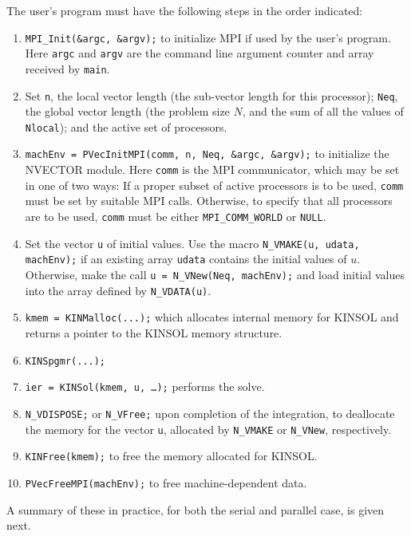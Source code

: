 \documentclass[11pt]{article}
\begin{document}
The user's program must have the following steps in the order indicated:
\vspace{.2 in}
\begin{enumerate}

\item {\tt MPI\_Init(\&argc, \&argv);} to initialize MPI if used by
the user's program.  Here {\tt argc} and {\tt argv} are the command
line argument counter and array received by {\tt main}.

\item Set {\tt n}, the local vector length (the sub-vector
length for this processor); {\tt Neq}, the global vector length (the
problem size $N$, and the sum of all the values of {\tt Nlocal});
and the active set of processors.

\item {\tt machEnv = PVecInitMPI(comm, n, Neq, \&argc, \&argv);} to
initialize the NVECTOR module.  Here {\tt comm} is the MPI
communicator, which may be set in one of two ways: If a proper subset of active
processors is to be used, {\tt comm} must be set by suitable MPI
calls.  Otherwise, to specify that all processors are to be used, 
{\tt comm} must be either {\tt MPI\_COMM\_WORLD} or {\tt NULL}.

\item Set the vector {\tt u} of initial values.  Use the macro
{\tt N\_VMAKE(u, udata, machEnv);} if an existing array {\tt udata} 
contains the initial values of $u$.  Otherwise, make the call
{\tt u = N\_VNew(Neq, machEnv);} and load initial values into
the array defined by {\tt N\_VDATA(u)}.

\item {\tt kmem = KINMalloc(...);} which allocates internal
memory for KINSOL and returns a pointer to the KINSOL memory structure. 

\item {\tt KINSpgmr(...);}

\item {\tt ier = KINSol(kmem,  u, \ldots );} performs the solve.

\item {\tt N\_VDISPOSE;} or {\tt N\_VFree;} upon completion of the
integration, to deallocate the memory for the vector {\tt u}, allocated
by {\tt N\_VMAKE} or {\tt N\_VNew}, respectively.

\item {\tt KINFree(kmem);} to free the memory allocated for KINSOL.

\item {\tt PVecFreeMPI(machEnv);} to free machine-dependent data.

\end{enumerate}
\vspace{.2 in}
 A summary of these in practice, for both the serial and parallel case, is 
given next.
\vspace{.2 in}
\end{document}
